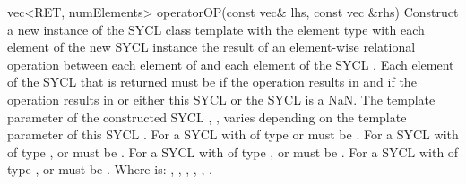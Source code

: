   \addRow
    {vec<RET, numElements> operatorOP(const vec\& lhs, const vec \&rhs)}
    {
      Construct a new instance of the SYCL  class template with the element type  with each element of the new SYCL  instance the result of an element-wise  relational operation between each element of   and each element of the  SYCL . Each element of the SYCL  that is returned must be  if the operation results in  and  if the operation results in  or either this SYCL  or the  SYCL  is a NaN.
      \newline \newline
      The  template parameter of the constructed SYCL , , varies depending on the  template parameter of this SYCL . For a SYCL  with  of type  or   must be . For a SYCL  with  of type ,  or   must be . For a SYCL  with  of type ,  or   must be . For a SYCL  with  of type ,  or   must be .
      \newline \newline
      Where  is: \codeinline{==}, \codeinline{!=}, \codeinline{<}, \codeinline{>}, \codeinline{<=}, \codeinline{>=}.
    }
    
